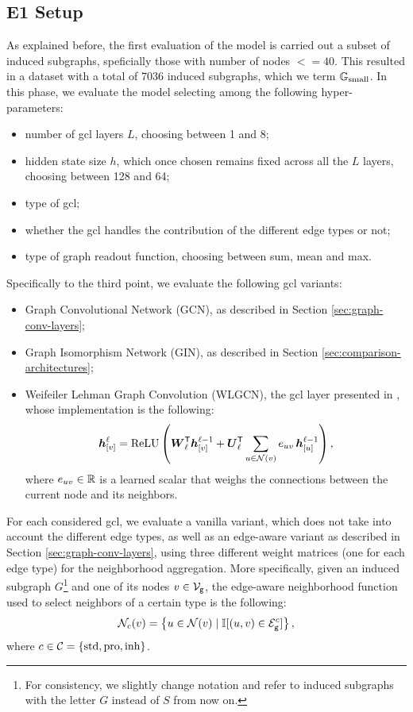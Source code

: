 \subsection{E1 Setup}
As explained before, the first evaluation of the model is carried out a subset of induced subgraphs, speficially those with number of nodes $<= 40$. This resulted in a dataset with a total of 7036 induced subgraphs, which we term $\mathbb{G}_{\mathrm{small}}$. In this phase, we evaluate the model selecting among the following hyper-parameters:
\begin{itemize}
    \item number of \gls{gcl} layers $L$, choosing between 1 and 8;
    \item hidden state size $h$, which once chosen remains fixed across all the $L$ layers, choosing between 128 and 64;
    \item type of \gls{gcl};
    \item whether the \gls{gcl} handles the contribution of the different edge types or not;
    \item type of graph readout function, choosing between sum, mean and max.
\end{itemize}
Specifically to the third point, we evaluate the following \gls{gcl} variants:
\begin{itemize}
    \item Graph Convolutional Network (GCN), as described in Section \ref{sec:graph-conv-layers};
    \item Graph Isomorphism Network (GIN), as described in Section \ref{sec:comparison-architectures};
    \item Weifeiler Lehman Graph Convolution (WLGCN), \ie the \gls{gcl} layer presented in \citep{morris2019weisfeilerlehmangoneural}, whose implementation is the following:
    $$\Elem{h}{v}^{\ell} = \Fun{ReLU}\Par{\Matrix{W}_{\ell}^{\Transpose} \Elem{h}{v}^{\ell-1} + \Matrix{U}_{\ell}^{\Transpose} \sum_{u \in \Neigh(v)} e_{uv}\, \Elem{h}{u}^{\ell-1}},$$
    where $e_{uv} \in \mathbb{R}$ is a learned scalar that weighs the connections between the current node and its neighbors.
\end{itemize}
For each considered \gls{gcl}, we evaluate a vanilla variant, which does not take into account the different edge types, as well as an edge-aware variant as described in Section \ref{sec:graph-conv-layers}, using three different weight matrices (one for each edge type) for the neighborhood aggregation. More specifically, given an induced subgraph $G$\footnote{For consistency, we slightly change notation and refer to induced subgraphs with the letter $G$ instead of $S$ from now on.} and one of its nodes $v \in \Nodes_{\Graph{g}}$, the edge-aware neighborhood function used to select neighbors of a certain type is the following:
$$\Neigh_c(v) = \Set{u \in \Neigh(v) \mid \Indic[ (u,v) \in \Edges_{\Graph{g}}^c]},$$
where $c \in \Cal{C} = \Set{\Fun{std}, \Fun{pro}, \Fun{inh}}$.


